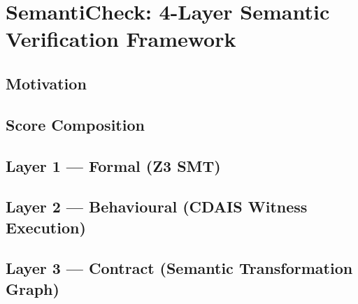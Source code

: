 \documentclass[12pt,a4paper]{report}
\begin{document}
\section{SemantiCheck: 4-Layer Semantic Verification Framework}
\label{sec:semanticheck-impl}

  \subsection{Motivation}
  \label{subsec:semanticheck-motivation}

  \subsection{Score Composition}
  \label{subsec:semanticheck-score}

  \subsection{Layer 1 --- Formal (Z3 SMT)}
  \label{subsec:sc-l1}

  \subsection{Layer 2 --- Behavioural (CDAIS Witness Execution)}
  \label{subsec:sc-l2}

  \subsection{Layer 3 --- Contract (Semantic Transformation Graph)}
  \label{subsec:sc-l3}
\end{document}
